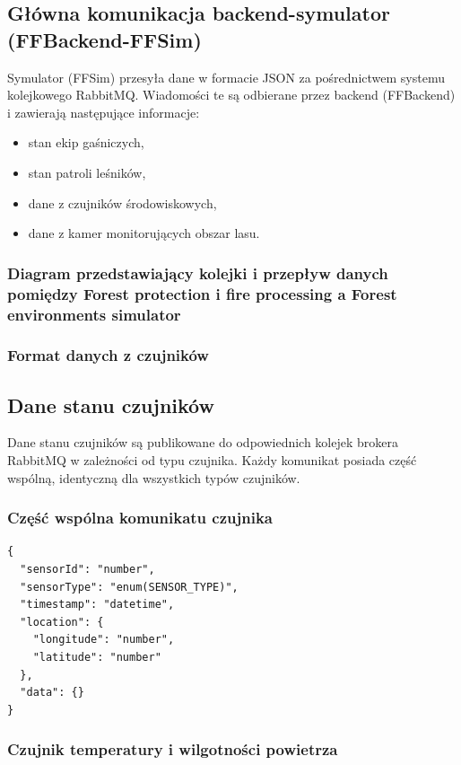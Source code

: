 \subsection{Główna komunikacja backend-symulator (FFBackend-FFSim) }
Symulator (FFSim) przesyła dane w formacie JSON za pośrednictwem systemu kolejkowego RabbitMQ. Wiadomości te są odbierane przez backend (FFBackend) i zawierają następujące informacje:
\begin{itemize}
    \item stan ekip gaśniczych,
    \item stan patroli leśników,
    \item dane z czujników środowiskowych,
    \item dane z kamer monitorujących obszar lasu.
\end{itemize}

\subsubsection{ Diagram przedstawiający kolejki i przepływ danych pomiędzy Forest protection i fire processing a Forest environments simulator}

\subsubsection{Format danych z czujników }

\subsection{Dane stanu czujników}

Dane stanu czujników są publikowane do odpowiednich kolejek brokera RabbitMQ w zależności od typu czujnika. Każdy komunikat posiada część wspólną, identyczną dla wszystkich typów czujników.

\subsubsection*{Część wspólna komunikatu czujnika}

\begin{verbatim}
{
  "sensorId": "number",
  "sensorType": "enum(SENSOR_TYPE)",
  "timestamp": "datetime",
  "location": {
    "longitude": "number",
    "latitude": "number"
  },
  "data": {}
}
\end{verbatim}

\subsubsection*{Czujnik temperatury i wilgotności powietrza}

